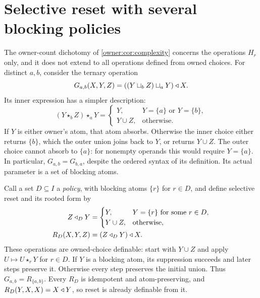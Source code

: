 \section{Selective reset with several blocking policies}
\label{app:selective}

The owner-count dichotomy of \cref{owner:cor:complexity} concerns the operations $H_r$ only, and it does not extend to all operations defined from owned choices. For distinct $a,b$, consider the ternary operation
\[
 G_{a,b}(X,Y,Z)=((Y\sqcup_b Z)\sqcup_a Y)\mathbin{\triangleleft} X.
\]
Its inner expression has a simpler description:
\begin{equation}\label{selective:eq:inner}
 (Y\star_b Z)\star_a Y=
 \begin{cases}
 Y,&Y=\{a\}\text{ or }Y=\{b\},\\
 Y\cup Z,&\text{otherwise}.
 \end{cases}
\end{equation}
If $Y$ is either owner's atom, that atom absorbs. Otherwise the inner
choice either returns $\{b\}$, which the outer union joins back to $Y$,
or returns $Y\cup Z$. The outer choice cannot absorb to $\{a\}$:
for nonempty operands this would require $Y=\{a\}$.
In particular, $G_{a,b}=G_{b,a}$, despite the ordered syntax of its
definition. Its actual parameter is a set of blocking atoms.

Call a set $D\subseteq I$ a \emph{policy}, with blocking atoms $\{r\}$ for $r\in D$, and define selective reset and its rooted form by
\begin{align*}
 Z\mathbin{\triangleleft_D}Y
   &=\begin{cases}Y,&Y=\{r\}\text{ for some }r\in D,\\
                   Y\cup Z,&\text{otherwise},\end{cases}\\
 R_D(X,Y,Z)&=(Z\mathbin{\triangleleft_D}Y)\mathbin{\triangleleft} X.
\end{align*}
These operations are owned-choice definable: start with $Y\cup Z$ and
apply $U\mapsto U\star_r Y$ for $r\in D$. If $Y$ is a blocking atom,
its suppression succeeds and later steps preserve it. Otherwise every
step preserves the initial union. Thus
$G_{a,b}=R_{\{a,b\}}$. Every $R_D$ is idempotent and atom-preserving,
and $R_D(Y,X,X)=X\mathbin{\triangleleft} Y$, so reset is already definable from it.

